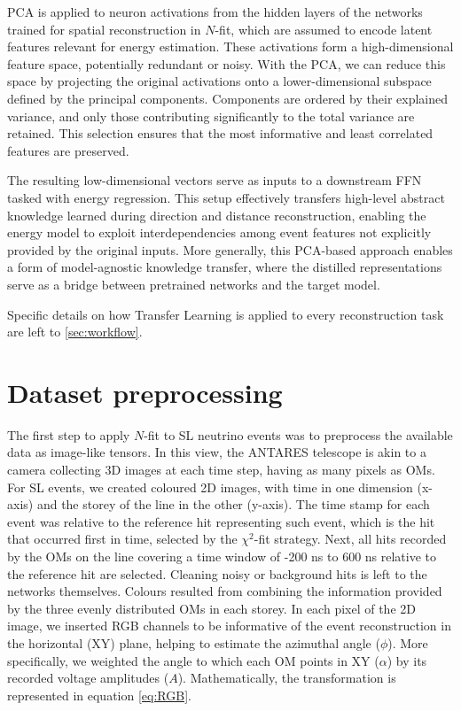 PCA is applied to neuron activations from the hidden layers of the networks trained for spatial reconstruction in $N$-fit, which are assumed to encode latent features relevant for energy estimation. These activations form a high-dimensional feature space, potentially redundant or noisy. With the PCA, we can reduce this space by projecting the original activations onto a lower-dimensional subspace defined by the principal components. Components are ordered by their explained variance, and only those contributing significantly to the total variance are retained. This selection ensures that the most informative and least correlated features are preserved.

The resulting low-dimensional vectors serve as inputs to a downstream FFN tasked with energy regression. This setup effectively transfers high-level abstract knowledge learned during direction and distance reconstruction, enabling the energy model to exploit interdependencies among event features not explicitly provided by the original inputs. More generally, this PCA-based approach enables a form of model-agnostic knowledge transfer, where the distilled representations serve as a bridge between pretrained networks and the target model.

Specific details on how Transfer Learning is applied to every reconstruction task are left to \autoref{sec:workflow}.

\section{Dataset preprocessing}
\label{sec:data}

The first step to apply $N$-fit to SL neutrino events was to preprocess the available data as image-like tensors. In this view, the ANTARES telescope is akin to a camera collecting 3D images at each time step, having as many pixels as OMs. For SL events, we created coloured 2D images, with time in one dimension (x-axis) and the storey of the line in the other (y-axis). 
The time stamp for each event was relative to the reference hit representing such event, which is the hit that occurred first in time, selected by the $\chi^2$-fit strategy. Next, all hits recorded by the OMs on the line covering a time window of -200 ns to 600 ns relative to the reference hit are selected. Cleaning noisy or background hits is left to the networks themselves. Colours resulted from combining the information provided by the three evenly distributed OMs in each storey. In each pixel of the 2D image, we inserted RGB channels to be informative of the event reconstruction in the horizontal (XY) plane, helping to estimate the azimuthal angle ($\phi$). More specifically, we weighted the angle to which each OM points in XY ($\alpha$) by its recorded voltage amplitudes ($A$). Mathematically, the transformation is represented in equation \ref{eq:RGB}.

